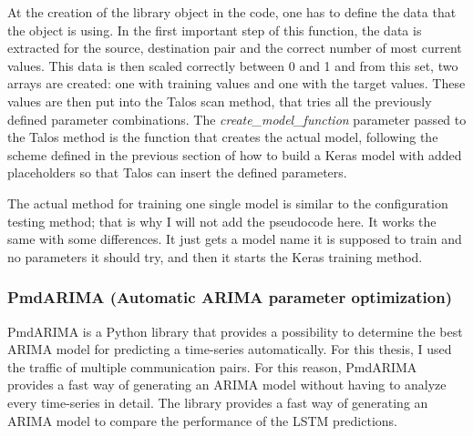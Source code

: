 At the creation of the library object in the code, one has to define the data that the object is using.
In the first important step of this function, the data is extracted for the source, destination pair and the correct number of most current values.
This data is then scaled correctly between 0 and 1 and from this set, two arrays are created: one with training values and one with the target values.
These values are then put into the Talos scan method, that tries all the previously defined parameter combinations.
The \textit{create\_model\_function} parameter passed to the Talos method is the function that creates the actual model, following the scheme defined in the previous section of how to build a Keras model with added placeholders so that Talos can insert the defined parameters.

The actual method for training one single model is similar to the configuration testing method; that is why I will not add the pseudocode here.
It works the same with some differences.
It just gets a model name it is supposed to train and no parameters it should try, and then it starts the Keras training method.

\subsubsection{PmdARIMA (Automatic ARIMA parameter optimization)}
PmdARIMA is a Python library that provides a possibility to determine the best ARIMA model for predicting a time-series automatically.
For this thesis, I used the traffic of multiple communication pairs.
For this reason, PmdARIMA provides a fast way of generating an ARIMA model without having to analyze every time-series in detail.
The library provides a fast way of generating an ARIMA model to compare the performance of the LSTM predictions.

